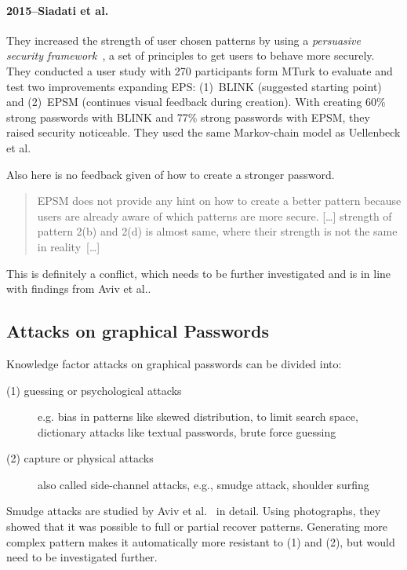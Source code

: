 \documentclass[twocolumn, a4paper, 10pt]{article}
\begin{document}
\paragraph{2015--Siadati et al.~\cite{siadati2015fortifying}}
They increased the strength of user chosen patterns by using a \textit{persuasive security framework}~\cite{forget2007persuasion, forget2008persuasion}, a set of principles to get users to behave more securely. They conducted a user study with 270 participants form MTurk to evaluate and test
two improvements expanding EPS: (1)~BLINK (suggested starting point) and (2)~EPSM (continues visual feedback during creation). With creating 60\% strong passwords with BLINK and 77\% strong passwords with EPSM, they raised security noticeable. They used the same Markov-chain model as Uellenbeck et al.~\cite{Uellenbeck:2013:QSG:2508859.2516700}

Also here is no feedback given of how to create a stronger password.

\begin{quote}
	\small
	EPSM does not provide any hint on how to create a better pattern because users are already aware of which patterns are more secure. [\dots] strength of pattern 2(b) and 2(d) is almost same, where their strength is not the same in reality~[\dots]
\end{quote}

This is definitely a conflict, which needs to be further investigated and is in line with findings from Aviv et al.\cite{Aviv:2014:UVP:2664243.2664253}.


\subsection{Attacks on graphical Passwords}
\label{sec:related:attacks}

Knowledge factor attacks on graphical passwords can be divided into:

\begin{description}
	\item[(1) guessing or psychological attacks] e.g. bias in patterns like skewed distribution, to limit search space, dictionary attacks like textual passwords, brute force guessing
	\item[(2) capture or physical attacks] also called side-channel attacks, e.g., smudge attack, shoulder surfing
\end{description}

Smudge attacks are studied by Aviv et al.~\cite{Aviv:2010:SAS:1925004.1925009} in detail. Using photographs, they showed that it was possible to full or partial recover patterns. Generating more complex pattern makes it automatically more resistant to (1) and (2), but would need to be investigated further. 
\end{document}
